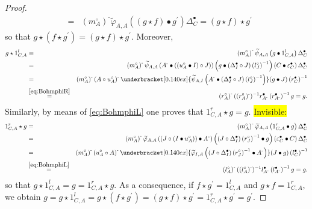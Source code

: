 \documentclass[nosumlimits,twoside]{amsart}
\theoremstyle{definition}
\theoremstyle{remark}
\def\revsn{\text{-}}
\newenvironment{invisible}{{\noindent\sc \colorbox{yellow}{Invisible:}\;}\color{gray}}{\medskip}
\begin{document}
\begin{proof}
\begin{eqnarray*}
&=&\left( m_{A}^{\circ }\right) ^{\revsn}\widetilde{\varphi }_{A,A}\left(
\left( g\star f\right) \bullet g^{\prime }\right) \Delta _{C}^{\bullet
}=\left( g\star f\right) \star g^{\prime }
\end{eqnarray*}
so that $g\star \left( f\star g^{\prime }\right) =\left( g\star f\right) \star
g^{\prime }.$ Moreover,
\begin{eqnarray*}
g\star 1_{C,A}^{l} &=&\left( m_{A}^{\circ }\right) ^{\revsn }\widetilde{\psi }%
_{A,A}\left( g\bullet 1_{C,A}^{l}\right) \Delta _{C}^{\bullet } \\
&=&\left( m_{A}^{\circ }\right) ^{\revsn }\widetilde{\psi }_{A,A}\left(
A^{\revsn }\bullet \left( \left( u_{A}^{\circ }\bullet I\right) \circ J\right)
\right) \left( g\bullet \left( \Delta _{I}^{\bullet }\circ J\right) \left(
l_{J}^{\circ }\right) ^{-1}\right) \left( C\bullet \varepsilon _{C}^{\bullet
}\right) \Delta _{C}^{\bullet } \\
&=&\left( m_{A}^{\circ }\right) ^{\revsn }\left( A\circ u_{A}^{\circ }\right)
^{\revsn }\underbracket[0.140ex]{\widetilde{\psi }_{A,I}\left( A^\revsn\bullet \left( \Delta _{I}^{\bullet
}\circ J\right) \left( l_{J}^{\circ }\right) ^{-1}\right)}(g\bullet J) \left(
r_{C}^{\bullet }\right) ^{-1} \\
&\overset{\eqref{eq:BohmphiR}}=&\left( r_{A}^{\circ }\right) ^{\revsn }((r_A^\circ)^\revsn)^{-1}r_{A^\revsn}^\bullet \left( r_{A^{\revsn }}^{\bullet }\right)
^{-1}g =g.
\end{eqnarray*}%
Similarly, by means of \eqref{eq:BohmphiL} one proves that $1_{C,A}^{r}\star g=g.$
\begin{invisible}
\begin{eqnarray*}
1_{C,A}^{r}\star g &=&\left( m_{A}^{\circ }\right) ^{\revsn }\widetilde{\varphi
}_{A,A}\left( 1_{C,A}^{r}\bullet g\right) \Delta _{C}^{\bullet } \\
&=&\left( m_{A}^{\circ }\right) ^{\revsn }\widetilde{\varphi }_{A,A}\left(
\left( J\circ \left( I\bullet u_{A}^{\circ }\right) \right) \bullet A^{\revsn
}\right) \left( \left( J\circ \Delta _{I}^{\bullet }\right) \left(
r_{J}^{\circ }\right) ^{-1}\bullet g\right) \left( \varepsilon _{C}^{\bullet
}\bullet C\right) \Delta _{C}^{\bullet } \\
&=&\left( m_{A}^{\circ }\right) ^{\revsn }\left( u_{A}^{\circ }\circ A\right)
^{\revsn }\underbracket[0.140ex]{\widetilde{\varphi }_{I,A}\left( \left( J\circ \Delta _{I}^{\bullet
}\right) \left( r_{J}^{\circ }\right) ^{-1}\bullet A^\revsn\right)} (J\bullet g)\left(
l_{C}^{\bullet }\right) ^{-1} \\
&\overset{\eqref{eq:BohmphiL}}=&\left( l_{A}^{\circ }\right) ^{\revsn }((l_A^\circ)^\revsn)^{-1}l_{A^\revsn}^\bullet \left( l_{A^{\revsn
}}^{\bullet }\right) ^{-1}g =g.
\end{eqnarray*}%
so that $g\star 1_{C,A}^{l}=g=1_{C,A}^{r}\star g.$ \end{invisible}
As a consequence, if $f\star
g^{\prime }=1_{C,A}^{l}$ and $g\star f=1_{C,A}^{r},$ we obtain
$g=g\star 1_{C,A}^{l}=g\star \left( f\star g^{\prime }\right) =\left( g\star
f\right) \star g^{\prime }=1_{C,A}^{r}\star g^{\prime }=g^{\prime }$.
\end{proof}
\end{document}
